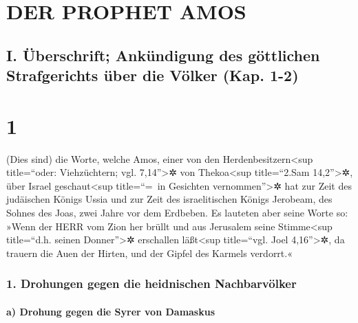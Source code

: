 \hypertarget{der-prophet-amos}{%
\section{DER PROPHET AMOS}\label{der-prophet-amos}}

\hypertarget{i.-uxfcberschrift-ankuxfcndigung-des-guxf6ttlichen-strafgerichts-uxfcber-die-vuxf6lker-kap.-1-2}{%
\subsection{I. Überschrift; Ankündigung des göttlichen Strafgerichts
über die Völker (Kap.
1-2)}\label{i.-uxfcberschrift-ankuxfcndigung-des-guxf6ttlichen-strafgerichts-uxfcber-die-vuxf6lker-kap.-1-2}}

\hypertarget{section}{%
\section{1}\label{section}}

(Dies sind) die Worte, welche Amos, einer von den
Herdenbesitzern\textless sup title=``oder: Viehzüchtern; vgl.
7,14''\textgreater✲ von Thekoa\textless sup title=``2.Sam
14,2''\textgreater✲, über Israel geschaut\textless sup title=``=~in
Gesichten vernommen''\textgreater✲ hat zur Zeit des judäischen Königs
Ussia und zur Zeit des israelitischen Königs Jerobeam, des Sohnes des
Joas, zwei Jahre vor dem Erdbeben. Es lauteten aber seine
Worte so: »Wenn der HERR vom Zion her brüllt und aus Jerusalem seine
Stimme\textless sup title=``d.h. seinen Donner''\textgreater✲ erschallen
läßt\textless sup title=``vgl. Joel 4,16''\textgreater✲, da trauern die
Auen der Hirten, und der Gipfel des Karmels verdorrt.«

\hypertarget{drohungen-gegen-die-heidnischen-nachbarvuxf6lker}{%
\subsubsection{1. Drohungen gegen die heidnischen
Nachbarvölker}\label{drohungen-gegen-die-heidnischen-nachbarvuxf6lker}}

\hypertarget{a-drohung-gegen-die-syrer-von-damaskus}{%
\paragraph{a) Drohung gegen die Syrer von
Damaskus}\label{a-drohung-gegen-die-syrer-von-damaskus}}

